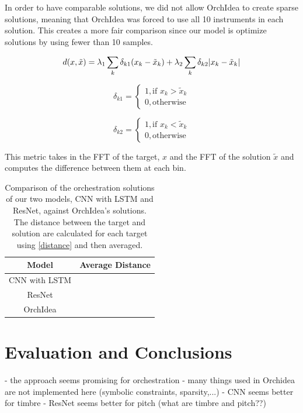 \documentclass{article}
\begin{document}
In order to have comparable solutions, we did not allow OrchIdea to create sparse solutions, meaning that OrchIdea was forced to use all 10 instruments in each solution. This creates a more fair comparison since our model is optimize solutions by using fewer than 10 samples.

\begin{equation}\label{distance}
d(x, \tilde{x}) =\lambda_1 \sum_k \delta_{k1}(x_k - \tilde{x}_k) + \lambda_2 \sum_k \delta_{k2}|x_k - \tilde{x	}_k| \\
\end{equation}

\begin{equation}
\delta_{k1} = 
\begin{cases}
1, \text{if   } x_k > \tilde{x}_k \\
0, \text{otherwise}
\end{cases} 
\end{equation}

\begin{equation}
\delta_{k2} = 
\begin{cases}
1, \text{if   } x_k < \tilde{x}_k \\
0, \text{otherwise}
\end{cases}
\end{equation}

This metric takes in the FFT of the target, $x$ and the FFT of the solution $\tilde{x}$ and computes the difference between them at each bin.

\begin{table}
  \begin{center}
    \label{orch_eval}
    \begin{tabular}{|c|c|} 
    	  \hline
      \textbf{Model} & \textbf{Average Distance} \\
      \hline
      CNN with LSTM &   \\
      \hline
      ResNet &  \\
      \hline
      OrchIdea &  \\
      \hline
    \end{tabular}
  \end{center}
  \caption{Comparison of the orchestration solutions of our two models, CNN with LSTM and ResNet, against OrchIdea's solutions. The distance between the target and solution are calculated for each target using \eqref{distance} and then averaged.}
\end{table}

\section{Evaluation and Conclusions}
- the approach seems promising for orchestration
- many things used in Orchidea are not implemented here (symbolic constraints, sparsity,...)
- CNN seems better for timbre
- ResNet seems better for pitch (what are timbre and pitch??)
\end{document}
